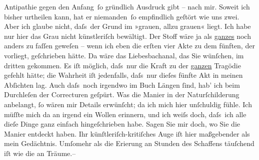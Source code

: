                Antipathie gegen den Anfang ſo gründlich Ausdruck gibt – nach mir. Soweit ich bisher
               urtheilen kann, hat er niemanden ſo empfindlich geſtört wie uns zwei. Aber ich glaube
               nicht, daſs der Grund im »grauen, allzu grauen« liegt. Ich habe nur hier {\pb}das Grau nicht künstleriſch bewältigt. Der Stoff wäre ja als \uline{ganzes} noch anders zu faſſen geweſen – wenn ich eben die erſten vier
               Akte zu dem fünften, der vorliegt, geſchrieben hätte. Da wäre das Liebesbachanal, das
               Sie wünſchen, im dritten gekommen. Es iſt möglich, daſs nur die Kraft zu der \uline{ganzen} Tragödie gefehlt hätte; die Wahrheit iſt
               jedenfalls, daſs nur dieſes fünfte Akt in meinen Abſichten lag. {\pb}Auch daſs noch irgendwo im Buch Längen{ }ſind, hab’ ich beim Durchleſen der Correcturen
               geſpürt. Was die Manier in der Naturſchilderung anbelangt,{ }ſo wären mir Details
               erwünſcht; da ich  mich hier unſchuldig fühle. Ich
               müſſte mich da an irgend ein Wollen erinnern, und ich weiſs doch, daſs ich alle dieſe
               Dinge ganz einfach hingeſchrieben habe. Sagen Sie mir doch, wo Sie die Manier
               entdeckt haben. Ihr künſtleriſch-kritiſches {\pb}Auge iſt hier
               maßgebender als mein Gedächtnis. Umſomehr als die Eri{\geminationn}erung an Stunden des Schaffens täuſchend iſt wie die an Träume.–\pend
           
